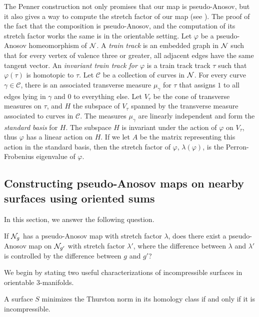  The Penner construction not only promises that our map is pseudo-Anosov, but it also gives a way to
compute the stretch factor of our map (see \cite{penner1988construction}).  The proof of the fact
that the composition is pseudo-Anosov, and the computation of its stretch factor works the same is
in the orientable setting.  Let $\varphi$ be a pseudo-Anosov homeomorphism of $\mathcal{N}$.  A {\it train track} is an embedded graph in $\mathcal{N}$ such that for every vertex of valence three or greater, all adjacent edges have the same tangent vector.  An {\it invariant train track for $\varphi$} is a train track track $\tau$ such that $\varphi(\tau)$ is homotopic to $\tau$.  Let $\mathcal{C}$ be a collection of curves in $\mathcal{N}$. %
For every curve $\gamma \in\mathcal{C}$, there is an associated transverse measure
$\mu_\gamma$ for $\tau$ that assigns $1$ to all edges lying in $\gamma$ and 0 to everything else. Let $V_\tau$
be the cone of transverse measures on $\tau$, and $H$ the subspace of $V_\tau$ spanned by the
transverse measure associated to curves in $\mathcal{C}$.
The measures $\mu_\gamma$ are linearly independent and form the \textit{standard basis} for $H$. The subspace $H$ is invariant under the action of $\varphi$ on $V_\tau$, thus $\varphi$ has a linear action on $H$. If we let $A$
be the matrix representing this action in the standard basis, then the stretch factor of $\varphi$,
$\lambda(\varphi)$, is the Perron-Frobenius eigenvalue of $\varphi$.

\subsection{Constructing pseudo-Anosov maps on nearby surfaces using oriented sums}
\label{sec:constr-psuedo-anos}

In this section, we answer the following question.
\begin{question}
  If $\mathcal{N}_g$ has a pseudo-Anosov map with stretch factor $\lambda$, does there exist a pseudo-Anosov map on $\mathcal{N}_{g'}$ with stretch factor $\lambda'$, where the difference between $\lambda$ and $\lambda'$ is controlled by the difference between $g$ and $g'$?
\end{question}

We begin by stating two useful characterizations of incompressible surfaces in orientable $3$-manifolds.
\begin{fact}
  \label{thm:norm-minimizing}
  A surface $S$ minimizes the Thurston norm in its homology class if and only if it is incompressible.
\end{fact}

